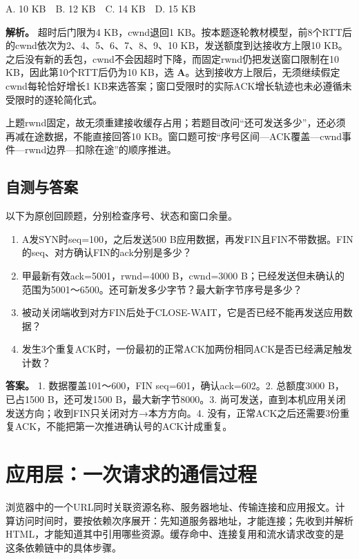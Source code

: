 A. 10 KB　B. 12 KB　C. 14 KB　D. 15 KB


\textbf{解析。} 超时后门限为4 KB，cwnd退回1 KB。按本题逐轮教材模型，前8个RTT后的cwnd依次为2、4、5、6、7、8、9、10 KB，发送额度到达接收方上限10 KB。之后没有新的丢包，cwnd不会因超时下降，而固定rwnd仍把发送窗口限制在10 KB，因此第10个RTT后仍为10 KB，选 \textbf{A}。达到接收方上限后，无须继续假定cwnd每轮恰好增长1 KB来选答案；窗口受限时的实际ACK增长轨迹也未必遵循未受限时的逐轮简化式。

上题rwnd固定，故无须重建接收缓存占用；若题目改问``还可发送多少''，还必须再减在途数据，不能直接回答10 KB。窗口题可按``序号区间---ACK覆盖---cwnd事件---rwnd边界---扣除在途''的顺序推进。

\section{自测与答案}\label{cn-ch5-review}

以下为原创回顾题，分别检查序号、状态和窗口余量。

\begin{enumerate}
\def\labelenumi{\arabic{enumi}.}
\tightlist
\item
  A发SYN时seq=100，之后发送500 B应用数据，再发FIN且FIN不带数据。FIN的seq、对方确认FIN的ack分别是多少？
\item
  甲最新有效ack=5001，rwnd=4000 B，cwnd=3000 B；已经发送但未确认的范围为5001～6500。还可新发多少字节？最大新字节序号是多少？
\item
  被动关闭端收到对方FIN后处于CLOSE-WAIT，它是否已经不能再发送应用数据？
\item
  发生3个重复ACK时，一份最初的正常ACK加两份相同ACK是否已经满足触发计数？
\end{enumerate}

\textbf{答案。} 1. 数据覆盖101～600，FIN seq=601，确认ack=602。2. 总额度3000 B，已占1500 B，还可发1500 B，最大新字节8000。3. 尚可发送，直到本机应用关闭发送方向；收到FIN只关闭对方→本方方向。4. 没有，正常ACK之后还需要3份重复ACK，不能把第一次推进确认号的ACK计成重复。

\chapter{应用层：一次请求的通信过程}\label{cn-ch6}

浏览器中的一个URL同时关联资源名称、服务器地址、传输连接和应用报文。计算访问时间时，要按依赖次序展开：先知道服务器地址，才能连接；先收到并解析HTML，才能知道其中引用哪些资源。缓存命中、连接复用和流水请求改变的是这条依赖链中的具体步骤。

